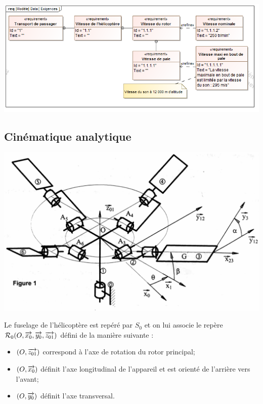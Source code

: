 \documentclass[10pt,fleqn]{article} %
\begin{document}
\begin{multicols}{2}

\begin{center}
\includegraphics[width=\linewidth]{images/SysML/Exigences}
\end{center}

\subsection*{Cinématique analytique}
\ifprof
\else
\begin{center}
\includegraphics[width=.8\linewidth]{images/fig2}
\end{center}

Le fuselage de l'hélicoptère est repéré par $S_0$ et on lui associe le repère $\mathcal{R}_0(O,\overrightarrow{x_0},\overrightarrow{y_0},\overrightarrow{z_{01}})$ défini de la
manière suivante :
\begin{itemize}
\item $(O,\overrightarrow{z_{01}})$ correspond à l'axe de rotation du rotor principal;
\item $(O, \overrightarrow{x_0} )$ définit l'axe longitudinal de l'appareil et est orienté de l'arrière vers l'avant;
\item $(O, \overrightarrow{y_0} )$ définit l'axe transversal.
\end{itemize}


\end{multicols}
\end{document}
